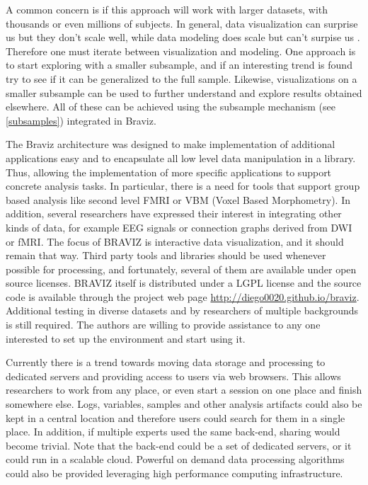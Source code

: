 \documentclass[twocolumn]{svjour3}
\begin{document}
A common concern is if this approach will work with larger datasets, with thousands or even millions of subjects. In general, data visualization can surprise us but they don't scale well, while data modeling does scale but can't surpise us \cite{grolemund_r_2016}. Therefore one must iterate between visualization and modeling. One approach is to start exploring with a smaller subsample, and if an interesting trend is found try to see if it can be generalized to the full sample. Likewise, visualizations on a smaller subsample can be used to further understand and explore results obtained elsewhere. All of these can be achieved using the subsample mechanism (see \ref{subsamples}) integrated in Braviz.

The Braviz architecture was designed to make implementation of additional applications easy and to encapsulate all low level data manipulation in a library. Thus, allowing the implementation of more specific applications to support concrete analysis tasks. In particular, there is a need for tools that support group based analysis like second level FMRI or VBM (Voxel Based Morphometry). In addition, several researchers have expressed their interest in integrating other kinds of data, for example EEG signals or connection graphs \cite{rubinov_complex_2010} derived from DWI or fMRI.  
The focus of BRAVIZ is interactive data visualization, and it should remain that way. Third party tools and libraries should be used whenever possible for processing, and fortunately, several of them are available under open source licenses. BRAVIZ itself is distributed under a LGPL license and the source code is available through the project web page \url{http://diego0020.github.io/braviz}. Additional testing in diverse datasets and by researchers of multiple backgrounds is still required. The authors are willing to provide assistance to any one interested to set up the environment and start using it. 
  
Currently there is a trend towards moving data storage and processing to dedicated servers and providing access to users via web browsers. This allows researchers to work from any place, or even start a session on one place and finish somewhere else. Logs, variables, samples and other analysis artifacts could also be kept in a central location and therefore users could search for them in a single place. In addition, if multiple experts used the same back-end, sharing would become trivial. Note that the back-end could be a set of dedicated servers, or it could run in a scalable cloud. Powerful on demand data processing algorithms could also be provided leveraging high performance computing infrastructure. 
\end{document}
